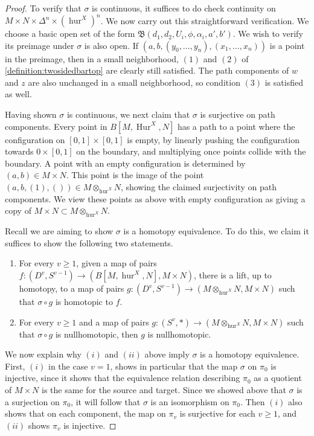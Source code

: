 \documentclass[12 pt]{amsart}
\theoremstyle{plain}
\theoremstyle{definition}
\theoremstyle{remark}
\numberwithin{equation}{section}
\DeclareMathOperator\Hur{Hur}
\begin{document}
\begin{proof}
	To verify that $\sigma$ is continuous, it suffices to do check
	continuity on $M\times N\times \Delta^n\times (\operatorname{hur}^X)^n$.
	We now carry out this straightforward verification.
	We choose a basic open set of the form $\mathfrak
	B(d_1,d_2,U_i,\phi,\alpha_i,a',b')$.
	We wish to verify its preimage under $\sigma$ is also open. If $(a, b,
	(y_0,\ldots, y_n), (x_1, \ldots, x_n))$ is a point in the preimage, then
	in a small neighborhood, $(1)$ and $(2)$ of
	\autoref{definition:twosidedbartop} are clearly still satisfied. The path
	components of $w$ and $z$ are also unchanged in a small neighborhood, so
	condition $(3)$ is satisfied as well.

	
	Having shown $\sigma$ is continuous, we next claim that $\sigma$ is surjective on path components. 
	Every point in $B[M,\Hur^{X},N]$ has a path to a point where the
	configuration on $[0,1]\times [0,1]$ is empty, by linearly pushing the
	configuration towards $0\times [0,1]$ on the boundary, and multiplying
	once points collide with the boundary. A point with an empty
	configuration is determined by $(a,b) \in M\times N$. This point is the
	image of the point $(a,b,(1),()) \in M\otimes_{
	\operatorname{hur}^{X}}N$, showing the claimed surjectivity on path components.
	We view these points as above with empty configuration as giving a copy of $M\times N \subset M\otimes_{\operatorname{hur}^{X}}N$. 

	Recall we are aiming to show $\sigma$ is a homotopy equivalence. To do
	this, we claim it suffices to show the following two statements.
	\begin{enumerate}
		\item[(i)] For every $v\geq1$, given a map of pairs
		$f:(D^{v},S^{v-1}) \to (B[M,\operatorname{hur}^{X},N],
		M\times N)$, there is a lift, up to homotopy, to a map of pairs $g:(D^{v},S^{v-1}) \to (M\otimes_{ \operatorname{hur}^{X}}N,M\times N)$
		such that $\sigma \circ g$ is homotopic to $f$.
		\item[(ii)] For every $v\geq 1$ and a map of pairs $g:(S^v,*)
			\to (M\otimes_{ \operatorname{hur}^{X}}N,M\times N)$
			such that $\sigma \circ g$ is nullhomotopic, then $g$ is nullhomotopic.
	\end{enumerate}	

	We now explain why $(i)$ and $(ii)$ above imply $\sigma$ is a homotopy
	equivalence. First, $(i)$ in the case $v=1$, shows in particular that the
	map $\sigma$ on $\pi_0$ is injective, since it shows that the equivalence relation describing $\pi_0$ as a quotient of $M\times N$ is the same for the source and target.
	Since we showed above that $\sigma$ is a surjection on $\pi_0$, it will
	follow that $\sigma$ is an isomorphism on $\pi_0$.
	Then $(i)$ also shows that on each component, the map on $\pi_v$ is
	surjective for each $v \geq 1$, and $(ii)$ shows $\pi_v$ is injective.


\end{proof}
\end{document}
